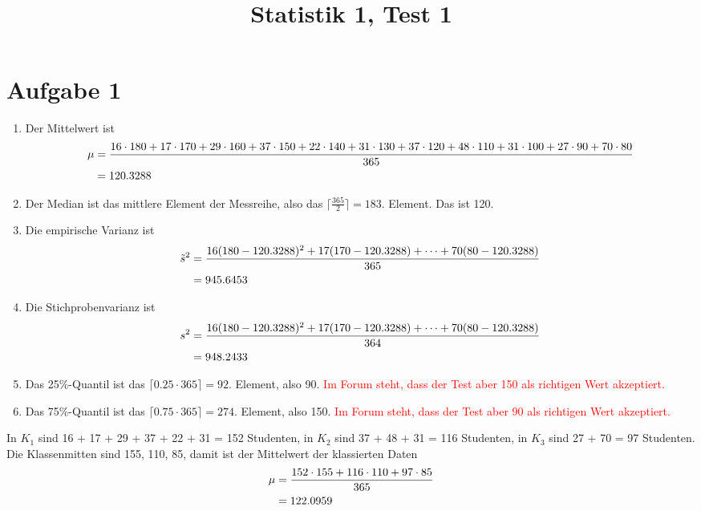 \documentclass{article}
\title{\textbf{Statistik 1, Test 1}}
\date{}
\begin{document}
	\maketitle
	
	\section*{Aufgabe 1}
	\begin{enumerate}[label=(\alph*)]
		\item Der Mittelwert ist
		\begin{align}
			\mu &= \frac{16\cdot 180 + 17\cdot 170 + 29\cdot 160 + 37\cdot 150 + 22\cdot 140 + 31\cdot 130 + 37\cdot 120 + 48\cdot 110 + 31\cdot 100 + 27\cdot 90 + 70\cdot 80}{365} \notag \\
			&= 120.3288 \notag
		\end{align}
		\item Der Median ist das mittlere Element der Messreihe, also das $\lceil\frac{365}{2}\rceil=183$. Element. Das ist 120.
		\item Die empirische Varianz ist
		\begin{align}
			\tilde{s}^2 &= \frac{16(180-120.3288)^2 + 17(170-120.3288) + \dots + 70(80-120.3288)}{365} \notag \\
			&= 945.6453 \notag
		\end{align}
		\item Die Stichprobenvarianz ist
		\begin{align}
			s^2 &= \frac{16(180-120.3288)^2 + 17(170-120.3288) + \dots + 70(80-120.3288)}{364} \notag \\
			&= 948.2433 \notag
		\end{align}
		\item Das 25\%-Quantil ist das $\lceil 0.25\cdot 365\rceil = 92$. Element, also 90. \textcolor{red}{Im Forum steht, dass der Test aber 150 als richtigen Wert akzeptiert.}
		\item Das 75\%-Quantil ist das $\lceil 0.75\cdot 365\rceil = 274$. Element, also 150. \textcolor{red}{Im Forum steht, dass der Test aber 90 als richtigen Wert akzeptiert.}
	\end{enumerate}
	
	 In $K_1$ sind 16 + 17 + 29 + 37 + 22 + 31 = 152 Studenten, in $K_2$ sind 37 + 48 + 31 = 116 Studenten, in $K_3$ sind 27 + 70 = 97 Studenten. Die Klassenmitten sind 155, 110, 85, damit ist der Mittelwert der klassierten Daten
	 \begin{align}
	 	\mu &= \frac{152\cdot 155 + 116\cdot 110 + 97\cdot 85}{365} \notag \\
	 	&= 122.0959 \notag
	 \end{align}
	 
\end{document}
